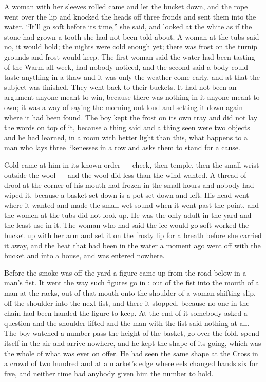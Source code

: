 A woman with her sleeves rolled came and let the bucket down, and the rope went over the lip and knocked the heads off three fronds and sent them into the water. “It'll go soft before its time,” she said, and looked at the white as if the stone had grown a tooth she had not been told about. A woman at the tubs said no, it would hold; the nights were cold enough yet; there was frost on the turnip grounds and frost would keep. The first woman said the water had been tasting of the Warm all week, had nobody noticed, and the second said a body could taste anything in a thaw and it was only the weather come early, and at that the subject was finished. They went back to their buckets. It had not been an argument anyone meant to win, because there was nothing in it anyone meant to own; it was a way of saying the morning out loud and setting it down again where it had been found. The boy kept the frost on its own tray and did not lay the words on top of it, because a thing said and a thing seen were two objects and he had learned, in a room with better light than this, what happens to a man who lays three likenesses in a row and asks them to stand for a cause.

Cold came at him in its known order --- cheek, then temple, then the small wrist outside the wool --- and the wool did less than the wind wanted. A thread of drool at the corner of his mouth had frozen in the small hours and nobody had wiped it, because a basket set down is a pot set down and left. His head went where it wanted and made the small wet sound when it went past the point, and the women at the tubs did not look up. He was the only adult in the yard and the least use in it. The woman who had said the ice would go soft worked the bucket up with her arm and set it on the frosty lip for a breath before she carried it away, and the heat that had been in the water a moment ago went off with the bucket and into a house, and was entered nowhere.

Before the smoke was off the yard a figure came up from the road below in a man's fist. It went the way such figures go in : out of the fist into the mouth of a man at the racks, out of that mouth onto the shoulder of a woman shifting slip, off the shoulder into the next fist, and there it stopped, because no one in the chain had been handed the figure to keep. At the end of it somebody asked a question and the shoulder lifted and the man with the fist said nothing at all. The boy watched a number pass the height of the basket, go over the fold, spend itself in the air and arrive nowhere, and he kept the shape of its going, which was the whole of what was ever on offer. He had seen the same shape at the Cross in a crowd of two hundred and at a market's edge where eels changed hands six for five, and neither time had anybody given him the number to hold.


